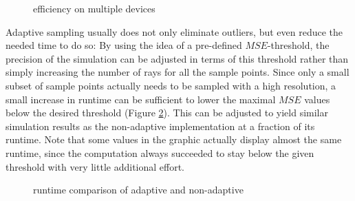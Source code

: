 \begin{figure}[H]
  \centerline{
    }
  \caption{efficiency on multiple devices}
  \label{plot:gpu_scaling}
\end{figure}
Adaptive sampling usually does not only eliminate outliers, but even reduce the
needed time to do so: By using the idea of a pre-defined $MSE$-threshold, the
precision of the simulation can be adjusted in terms of this threshold rather than
simply increasing the number of rays for all the sample points. Since only a
small subset of sample points actually needs to be sampled with a high
resolution, a small increase in runtime can be sufficient to lower the maximal
$MSE$ values below the desired threshold (Figure \ref{plot:adaptive_runtime}).
This can be adjusted to yield similar simulation results as the non-adaptive
implementation at a fraction of its runtime. Note that some values in the
graphic actually display almost the same runtime, since the computation always
succeeded to stay below the given threshold with very little additional effort.
\begin{figure}[H]
  \centerline{
    }
  \caption{runtime comparison of adaptive and non-adaptive }
  \label{plot:adaptive_runtime}
\end{figure}

